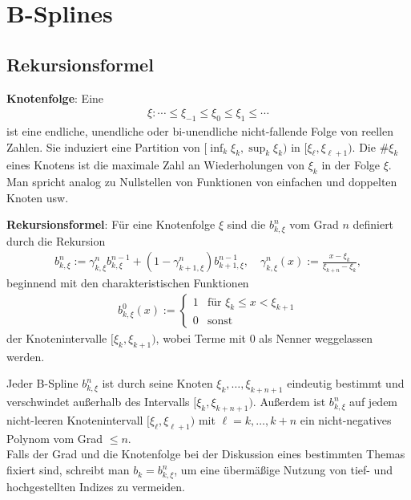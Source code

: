\section{%
    B-Splines%
}

\subsection{%
    Rekursionsformel%
}

\textbf{Knotenfolge}:
Eine 
\begin{align*}
    \xi\colon \dotsb \le \xi_{-1} \le \xi_0 \le \xi_1 \le \dotsb
\end{align*}
ist eine endliche, unendliche oder bi-unendliche nicht-fallende Folge von reellen Zahlen.
Sie induziert eine Partition von $[\inf_k \xi_k, \sup_k \xi_k)$ in 
$[\xi_\ell, \xi_{\ell+1})$.
Die  $\#\xi_k$ eines Knotens ist die maximale Zahl an Wiederholungen von
$\xi_k$ in der Folge $\xi$.
Man spricht analog zu Nullstellen von Funktionen von einfachen und doppelten Knoten usw.

\linie

\textbf{Rekursionsformel}:
Für eine Knotenfolge $\xi$ sind die  $b_{k,\xi}^n$ vom Grad $n$ definiert
durch die Rekursion
\begin{align*}
    b_{k,\xi}^n := \gamma_{k,\xi}^n b_{k,\xi}^{n-1} +
    (1 - \gamma_{k+1,\xi}^n) b_{k+1,\xi}^{n-1},\quad
    \gamma_{k,\xi}^n(x) := \frac{x - \xi_k}{\xi_{k+n} - \xi_k},
\end{align*}
beginnend mit den charakteristischen Funktionen
\begin{align*}
    b_{k,\xi}^0(x) :=
    \begin{cases}1 & \text{für } \xi_k \le x < \xi_{k+1}\\0 & \text{sonst}\end{cases}
\end{align*}
der Knotenintervalle $[\xi_k, \xi_{k+1})$, wobei Terme mit $0$ als Nenner weggelassen werden.

Jeder B-Spline $b_{k,\xi}^n$ ist durch seine Knoten $\xi_k, \dotsc, \xi_{k+n+1}$ eindeutig
bestimmt und verschwindet außerhalb des Intervalls $[\xi_k, \xi_{k+n+1})$.
Außerdem ist $b_{k,\xi}^n$ auf jedem nicht-leeren Knotenintervall $[\xi_\ell, \xi_{\ell+1})$ mit
$\ell = k, \dotsc, k + n$ ein nicht-negatives Polynom vom Grad $\le n$.\\
Falls der Grad und die Knotenfolge bei der Diskussion eines bestimmten Themas fixiert sind,
schreibt man $b_k = b_{k,\xi}^n$, um eine übermäßige Nutzung von tief- und hochgestellten Indizes
zu vermeiden.

